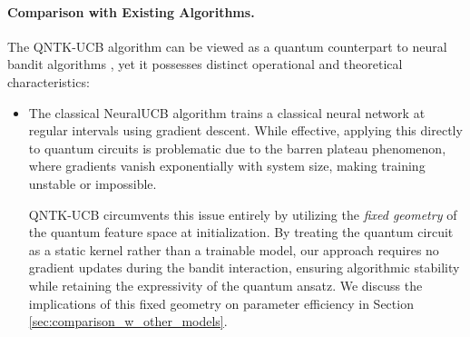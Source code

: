 \documentclass[pdflatex,sn-mathphys-num]{sn-jnl}%
\theoremstyle{thmstyleone}%
\theoremstyle{thmstyletwo}%
\theoremstyle{thmstylethree}%
\begin{document}
\paragraph{Comparison with Existing Algorithms. }
The QNTK-UCB algorithm can be viewed as a quantum counterpart to   neural bandit algorithms \cite{neuralucb}, yet it possesses distinct operational and theoretical characteristics:
\begin{itemize}
    \item The classical NeuralUCB algorithm \cite{neuralucb} trains a classical neural network at regular intervals using gradient descent. While effective, applying this directly to quantum circuits is problematic due to the barren plateau phenomenon, where gradients vanish exponentially with system size, making training unstable or impossible. 

    QNTK-UCB circumvents this issue entirely by utilizing the {\em   fixed geometry} of the quantum feature space at initialization. By treating the quantum circuit as a static kernel rather than a trainable model, our approach requires no gradient updates during the bandit interaction, ensuring algorithmic stability while retaining the expressivity of the quantum ansatz. We discuss the implications of this fixed geometry on parameter efficiency in Section \ref{sec:comparison_w_other_models}.
    
    

\end{itemize}
\end{document}
